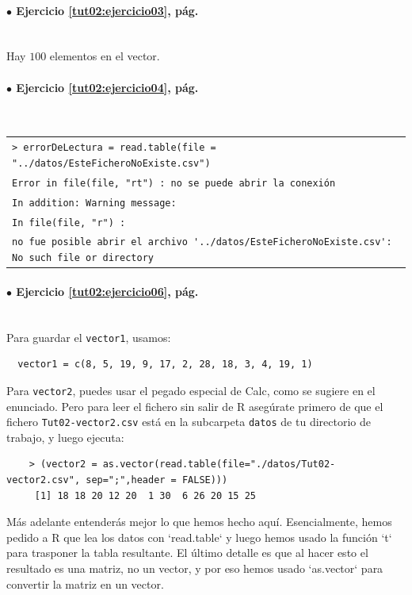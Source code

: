 \documentclass[10pt,a4paper]{article}\usepackage[]{graphicx}\usepackage[]{color}
\begin{document}
\paragraph{\bf $\bullet$ Ejercicio \ref{tut02:ejercicio03}, pág. \pageref{tut02:ejercicio03}}
\label{tut02:ejercicio03:sol}\quad\\
Hay $100$ elementos en el vector.

\paragraph{\bf $\bullet$ Ejercicio \ref{tut02:ejercicio04}, pág. \pageref{tut02:ejercicio04}}
\label{tut02:ejercicio04:sol}\quad\\
\begin{center}
\begin{tabular}{l}
\color{blue} {\verb#> errorDeLectura = read.table(file = "../datos/EsteFicheroNoExiste.csv")#}\\
\color{red} {\tt Error in file(file, \verb/"/rt\verb/"/) : no se puede abrir la conexión}\\
\color{red} {\tt In addition: Warning message:}\\
\color{red} {\tt In file(file, \verb/"/r\verb/"/) :}\\
\color{red} {\quad \verb#no fue posible abrir el archivo '../datos/EsteFicheroNoExiste.csv': No such file or directory#}
\end{tabular}
\end{center}
\color{black}

\paragraph{\bf $\bullet$ Ejercicio \ref{tut02:ejercicio06}, pág. \pageref{tut02:ejercicio06}}
\label{tut02:ejercicio06:sol}\quad\\
Para guardar el {\tt vector1}, usamos:
\begin{verbatim}
  vector1 = c(8, 5, 19, 9, 17, 2, 28, 18, 3, 4, 19, 1)
\end{verbatim}
Para {\tt vector2}, puedes usar el pegado especial de Calc, como se sugiere en el enunciado. Pero para leer el fichero sin salir de R asegúrate primero de que el fichero {\tt Tut02-vector2.csv} está en la subcarpeta {\tt datos} de tu directorio de trabajo, y luego ejecuta:
\begin{verbatim}
    > (vector2 = as.vector(read.table(file="./datos/Tut02-vector2.csv", sep=";",header = FALSE)))
     [1] 18 18 20 12 20  1 30  6 26 20 15 25
\end{verbatim}
Más adelante entenderás mejor lo que hemos hecho aquí. Esencialmente, hemos pedido a R que lea los datos con `read.table` y luego hemos usado la función `t` para trasponer la tabla resultante. El último detalle es que al hacer esto el resultado es una matriz, no un vector, y por eso hemos usado `as.vector` para convertir la matriz en un vector.
\end{document}
